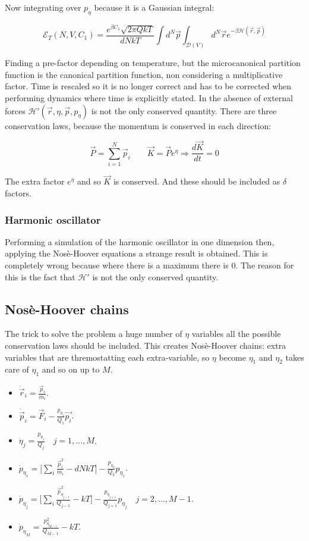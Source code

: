 	Now integrating over $p_\eta$ because it is a Gaussian integral:

	$$\mathcal{E}_T(N, V, C_1) = \frac{e^{\beta C_1}\sqrt{2\pi Qk T}}{dNkT}\int d^N\vec{p}\int_{\mathcal{D}(V)}d^N\vec{r}e^{-\beta\mathcal{H}(\vec{r}, \vec{p})}$$

	Finding a pre-factor depending on temperature, but the microcanonical partition function is the canonical partition function, non considering a multiplicative factor.
	Time is rescaled so it is no longer correct and has to be corrected when performing dynamics where time is explicitly stated.
	In the absence of external forces $\mathcal{H}'(\vec{r}, \eta, \vec{p}, p_\eta)$ is not the only conserved quantity.
	There are three conservation laws, because the momentum is conserved in each direction:

	$$\vec{P} = \sum\limits_{i=1}^N\vec{p}_i\qquad \vec{K} = \vec{P}e^\eta\Rightarrow \frac{d\vec{K}}{d t} = 0$$

	The extra factor $e^\eta$ and so $\vec{K}$ is conserved.
	And these should be included as $\delta$ factors.

		\subsubsection{Harmonic oscillator}
		Performing a simulation of the harmonic oscillator in one dimension then, applying the Nos\`e-Hoover equations a strange result is obtained.
		This is completely wrong because where there is a maximum there is $0$.
		The reason for this is the fact that $\mathcal{H}'$ is not the only conserved quantity.

	\subsection{Nos\`e-Hoover chains}
	The trick to solve the problem a huge number of $\eta$ variables all the possible conservation laws should be included.
	This creates Nos\`e-Hoover chains: extra variables that are thremostatting each extra-variable, so $\eta$ become $\eta_1$ and $\eta_2$ takes care of $\eta_1$ and so on up to $M$.

	\begin{multicols}{2}
		\begin{itemize}
			\item $\dot{\vec{r}}_i = \frac{\vec{p}_i}{m_i}$.
			\item $\dot{\vec{p}}_i = \vec{F}_i - \frac{p_{\eta_1}}{Q_1}\vec{p_i}$.
			\item $\dot{\eta}_j = \frac{p_{\eta_j}}{Q_j}\quad j = 1, \dots, M$.
			\item $\dot{p}_{\eta_1} = \biggl[\sum\limits_i\frac{\vec{p}_i^2}{m_i}-dNkT\biggr] - \frac{p_{\eta_2}}{Q_2}p_{\eta_1}$.
			\item $\dot{p}_{\eta_j} = \biggl[\sum\limits_i\frac{\vec{p}_{\eta_{j-1}}^2}{Q_{j-1}}-kT\biggr] - \frac{p_{\eta_{j+1}}}{Q_{j+1}}p_{\eta_j}\quad j = 2, \dots, M-1$.
			\item $\dot{p}_{\eta_M} = \frac{p^2_{\eta_{M-1}}}{Q_{M-1}}-kT$.
		\end{itemize}
	\end{multicols}

